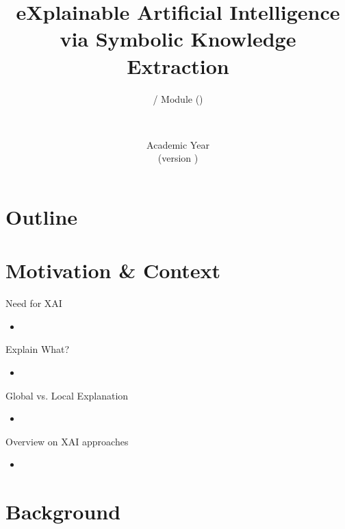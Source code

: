 \documentclass[presentation]{beamer}\mode<presentation>{\usetheme{AMSBolognaFC}}
\title[\currentLab{} -- XAI via SKE]{
    eXplainable Artificial Intelligence via Symbolic Knowledge Extraction
}
\subtitle{\courseName{} / Module \moduleN{} (\courseAcronym)}
\author[\sspeaker{\gcShort}]{\speaker{\gcFull} \\ \gcEmail}
\institute[\disiShort, \uniboShort]{\disi{} (\disiShort)\\\unibo}
\date[A.Y. \academicYear{} (v.\ \version)]{Academic Year \academicYear{}\\(version \version)}
\begin{document}

\frame{\titlepage}

\section*{Outline}
%
\frame[c]{\tableofcontents[hideallsubsections]}

\section{Motivation \& Context}

\begin{frame}{Need for XAI}
    \begin{itemize}
        \item 
    \end{itemize}
\end{frame}

\begin{frame}{Explain What?}
    \begin{itemize}
        \item 
    \end{itemize}
\end{frame}

\begin{frame}{Global vs. Local Explanation}
    \begin{itemize}
        \item 
    \end{itemize}
\end{frame}

\begin{frame}{Overview on XAI approaches}
    \begin{itemize}
        \item 
    \end{itemize}
\end{frame}

\section{Background}
\end{document}
